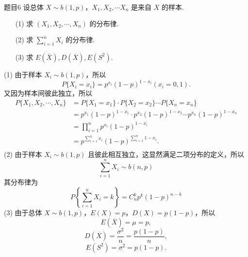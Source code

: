 \begin{question}{题目6}
    设总体 $X \sim b(1,p)$，$X_1, X_2, \cdots X_n$ 是来自 $X$ 的样本.
    \begin{enumerate}
        \item [(1)] 求 $(X_1, X_2, \cdots, X_n)$ 的分布律.
        \item [(2)] 求 $\displaystyle \sum_{i=1}^{n} X_i$ 的分布律.
        \item [(3)] 求 $E(\overline{X}), D(\overline{X}), E(S^2)$.
    \end{enumerate}
\end{question}
\begin{solution}
    (1) 由于样本 $X_i \sim b(1,p)$，所以
    $$
        P\{X_i = x_i\} = p^{x_i}(1-p)^{1-x_i} (x_i = 0, 1).
    $$
    又因为样本间彼此独立，所以
    $$
        \begin{aligned}
            P\{X_1, X_2, \cdots, X_n\}
             & = P\{X_1 = x_1\} \cdot P\{X_2 = x_2\} \cdots P\{X_n = x_n\}                   \\
             & = p^{x_1}(1-p)^{1-x_1} \cdot p^{x_2}(1-p)^{1-x_2} \cdots p^{x_n}(1-p)^{1-x_n} \\
             & = \prod_{i=1}^{n} p^{x_i}(1-p)^{1-x_i}                                        \\
             & = p^{\sum_{i=1}^{n} x_i}(1-p)^{\sum_{i=1}^{n} 1-x_i}.                         \\
        \end{aligned}
    $$
    (2) 由于样本 $X_i \sim b(1,p)$ 且彼此相互独立，这显然满足二项分布的定义，所以
    $$
        \sum_{i=1}^{n} X_i \sim b(n,p)
    $$
    其分布律为
    $$
        P\left\{\sum_{i=1}^n X_i = k\right\}
        = C_n^k p^k (1-p)^{n-k}
    $$
    (3) 由于总体 $X \sim b(1,p)$，$E(X) = p$，$D(X) = p(1-p)$，所以
    $$
        E(\overline{X}) = \mu = p,
    $$
    $$
        D(\overline{X}) = \frac{\sigma^2}{n} = \frac{p(1-p)}{n},
    $$
    $$
        E(S^2) = \sigma^2 = p(1-p).
    $$
\end{solution}